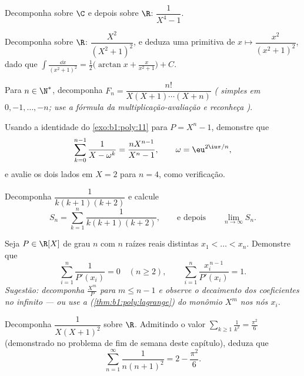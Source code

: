 \begin{exercise}[$\star\star$]\label{exo:b1:fractions:4}
Decomponha sobre $\C$ e depois sobre $\R$: $\dfrac{1}{X^4 - 1}$.
\end{exercise}

\begin{exercise}[$\star\star$]\label{exo:b1:fractions:5}
Decomponha sobre $\R$: $\dfrac{X^2}{(X^2 + 1)^2}$, e deduza uma
primitiva de $x \mapsto \dfrac{x^2}{(x^2+1)^2}$, dado que
$\int \frac{\dd x}{(x^2+1)^2} = \frac12\bigl(\arctan x +
\frac{x}{x^2+1}\bigr) + C$.
\end{exercise}

\begin{exercise}[$\star\star$]\label{exo:b1:fractions:6}
Para $n \in \N^*$, decomponha $F_n = \dfrac{n!}{X(X+1)\cdots(X+n)}$
\emph{( simples em $0, -1, \dots, -n$; use a fórmula da
multiplicação-avaliação e reconheça )}.
\end{exercise}

\begin{exercise}[$\star\star$]\label{exo:b1:fractions:7}
Usando a identidade do \cref{exo:b1:poly:11} para $P = X^n - 1$,
demonstre que
\[
\sum_{k=0}^{n-1} \frac{1}{X - \omega^k} = \frac{n X^{n-1}}{X^n - 1},
\qquad \omega = \eu^{2\iu\pi/n},
\]
e avalie os dois lados em $X = 2$ para $n = 4$, como verificação.
\end{exercise}

\begin{exercise}[$\star\star$]\label{exo:b1:fractions:8}
Decomponha $\dfrac{1}{k(k+1)(k+2)}$ e calcule
\[
S_n = \sum_{k=1}^{n} \frac{1}{k(k+1)(k+2)},
\qquad\text{e depois}\qquad
\lim_{n \to \infty} S_n .
\]
\end{exercise}

\begin{exercise}[$\star\star\star$]\label{exo:b1:fractions:9}
Seja $P \in \R[X]$  de grau $n$ com $n$ raízes reais distintas
$x_1 < \dots < x_n$. Demonstre que
\[
\sum_{i=1}^{n} \frac{1}{P'(x_i)} = 0 \quad (n \geq 2),
\qquad
\sum_{i=1}^{n} \frac{x_i^{\,n-1}}{P'(x_i)} = 1 .
\]
\emph{Sugestão: decomponha $\frac{X^m}{P}$ para $m \leq n - 1$ e observe
o decaimento dos coeficientes no infinito --- ou use a  (\cref{thm:b1:poly:lagrange}) do monômio $X^m$ nos nós
$x_i$.}
\end{exercise}

\begin{exercise}[$\star\star$]\label{exo:b1:fractions:10}
Decomponha $\dfrac{1}{X(X+1)^2}$ sobre $\R$. Admitindo o valor
$\sum_{k \geq 1} \frac1{k^2} = \frac{\pi^2}6$ (demonstrado no problema de fim de semana
deste capítulo), deduza que
\[
\sum_{n=1}^{\infty} \frac{1}{n(n+1)^2} = 2 - \frac{\pi^2}{6} .
\]
\end{exercise}

